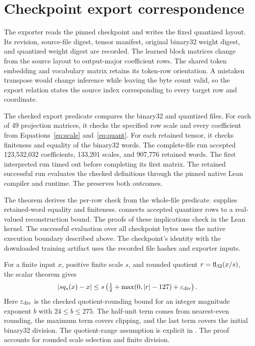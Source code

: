 \section{Checkpoint export correspondence}
\label{sec:export}

The exporter reads the pinned  checkpoint and writes the fixed quantized layout.  Its revision, source-file digest, tensor manifest, original binary32 weight digest, and quantized weight digest are recorded.  The learned block matrices change from the source layout to output-major coefficient rows.  The shared token embedding and vocabulary matrix retains its token-row orientation.  A mistaken transpose would change inference while leaving the byte count valid, so the export relation states the source index corresponding to every target row and coordinate.

The checked export predicate compares the binary32 and quantized files.  For each of 49 projection matrices, it checks the specified row scale and every coefficient from Equations~\eqref{eq:scale} and~\eqref{eq:quant}.  For each retained tensor, it checks finiteness and equality of the binary32 words.  The complete-file run accepted 123,532,032 coefficients, 133,201 scales, and 907,776 retained words.  The first interpreted run timed out before completing its first matrix.  The retained successful run evaluates the checked definitions through the pinned native Lean compiler and runtime.  The  preserves both outcomes.

The theorem  derives the per-row check from the whole-file predicate.   supplies retained-word equality and finiteness.   connects accepted quantizer rows to a real-valued reconstruction bound.  The proofs of these implications check in the Lean kernel.  The successful evaluation over all checkpoint bytes uses the native execution boundary described above.  The checkpoint's identity with the downloaded training artifact uses the recorded file hashes and exporter inputs.

For a finite input $x$, positive finite scale $s$, and rounded quotient $r=\operatorname{fl}_{32}(x/s)$, the scalar theorem gives
\begin{equation}
 |s q_s(x)-x|
 \leq s\left(\tfrac12+\max(0,|r|-127)+\varepsilon_{\rm div}\right).
 \label{eq:reconstruct}
\end{equation}
Here $\varepsilon_{\rm div}$ is the checked quotient-rounding bound for an integer magnitude exponent $b$ with $24\leq b\leq275$.  The half-unit term comes from nearest-even rounding, the maximum term covers clipping, and the last term covers the initial binary32 division.  The quotient-range assumption is explicit in .  The proof accounts for rounded scale selection and finite division.

